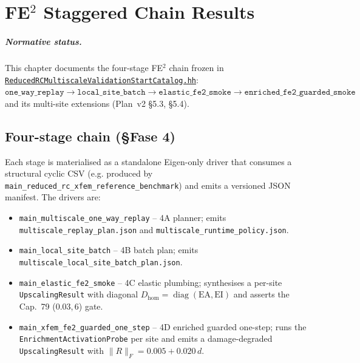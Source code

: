 
\chapter{FE\(^2\) Staggered Chain Results}
\label{ch:fe2-staggered-chain-results}

\paragraph{Normative status.}
This chapter documents the four-stage FE\(^2\) chain frozen in
\href{run:src/validation/ReducedRCMultiscaleValidationStartCatalog.hh}{%
\texttt{ReducedRCMultiscaleValidationStartCatalog.hh}}:
\(\texttt{one\_way\_replay} \to \texttt{local\_site\_batch} \to
\texttt{elastic\_fe2\_smoke} \to \texttt{enriched\_fe2\_guarded\_smoke}\)
and its multi-site extensions (Plan~v2 \S5.3, \S5.4).

\section{Four-stage chain (\S Fase 4)}

Each stage is materialised as a standalone Eigen-only driver that
consumes a structural cyclic CSV (e.g.  produced by
\texttt{main\_reduced\_rc\_xfem\_reference\_benchmark}) and emits a
versioned JSON manifest. The drivers are:

\begin{itemize}
  \item \texttt{main\_multiscale\_one\_way\_replay} -- 4A planner;
        emits \texttt{multiscale\_replay\_plan.json} and
        \texttt{multiscale\_runtime\_policy.json}.
  \item \texttt{main\_local\_site\_batch} -- 4B batch plan;
        emits \texttt{multiscale\_local\_site\_batch\_plan.json}.
  \item \texttt{main\_elastic\_fe2\_smoke} -- 4C elastic plumbing;
        synthesises a per-site \texttt{UpscalingResult} with diagonal
        \(D_{\mathrm{hom}}=\operatorname{diag}(\mathrm{EA},\mathrm{EI})\)
        and asserts the Cap.~79 (0.03,\,6) gate.
  \item \texttt{main\_xfem\_fe2\_guarded\_one\_step} -- 4D enriched
        guarded one-step; runs the
        \texttt{EnrichmentActivationProbe} per site and emits a
        damage-degraded \texttt{UpscalingResult} with
        \(\|R\|_F = 0.005 + 0.020\,d\).
\end{itemize}

